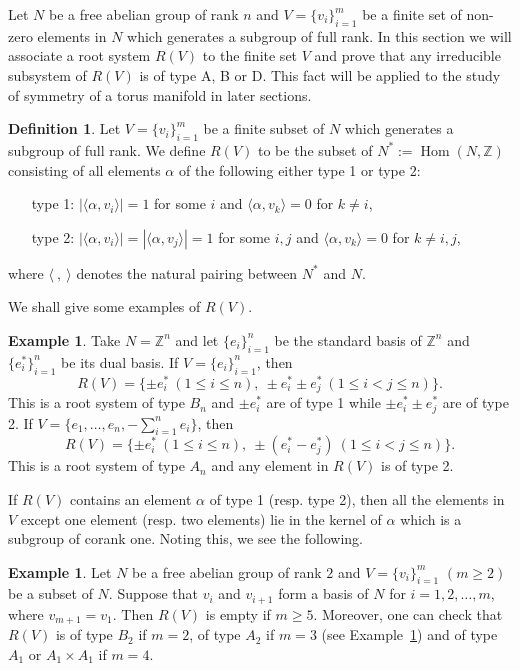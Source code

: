 \documentclass[12pt]{amsart}
\theoremstyle{plain} \numberwithin{equation}{section}
\theoremstyle{definition}
\newtheorem{defi}[theo]{Definition}
\newtheorem{exam}[theo]{Example}
\def\Z{\mathbb Z}
\def\MV{V}
\DeclareMathOperator{\Hom}{Hom}
\begin{document}
Let $N$ be a free abelian group of rank $n$ and $\MV=\{v_i\}_{i=1}^m$ be a finite set of non-zero elements in $N$ which generates a subgroup of full rank.  In this section we will associate a root system $R(\MV)$ to the finite set $\MV$ and prove that any irreducible subsystem of $R(\MV)$ is of type A, B or D.  
This fact will be applied to the study of symmetry of a torus manifold in later sections.  

\begin{defi} \label{defi:2-1}
Let $\MV=\{v_i\}_{i=1}^m$ be a finite subset of $N$ which generates a subgroup of full rank.  We define $R(\MV)$ to be the subset of $N^*:=\Hom(N,\Z)$ consisting of all elements $\alpha$ of the following either type 1 or type 2: 
\begin{enumerate}
\item[type 1:] $|\langle\alpha,v_i\rangle|=1$ for some $i$ and $\langle\alpha,v_k\rangle=0$ for $k\not=i$,  
\item[type 2:] $|\langle \alpha,v_i\rangle|=|\langle \alpha,v_j\rangle|=1$ for some $i,j$ and $\langle\alpha,v_k\rangle=0$ for $k\not=i,j$,
\end{enumerate}
where $\langle\ ,\ \rangle$ denotes the natural pairing between $N^*$ and $N$.  
\end{defi}

We shall give some examples of $R(\MV)$.  

\begin{exam} \label{exam:2-1}
Take $N=\Z^n$ and let $\{e_i\}_{i=1}^n$ be the standard basis of $\Z^n$ and $\{e_i^*\}_{i=1}^n$ be its dual basis. 
If $\MV=\{e_i\}_{i=1}^n$, then 
\[
R(\MV)=\{\pm e_i^*\ (1\le i\le n),\ \pm e_i^*\pm e_j^*\ (1\le i<j\le n) \}.
\]
This is a root system of type $B_n$ and $\pm e_i^*$ are of type 1 while $\pm e_i^*\pm e_j^*$ are of type 2.  
If $\MV=\{e_1,\dots,e_n, -\sum_{i=1}^ne_i\}$, then 
\[
R(\MV)=\{\pm e_i^*\ (1\le i\le n),\ \pm(e_i^*-e_j^*) \ (1\le i<j\le n)\}.
\]
This is a root system of type $A_n$ and any element in $R(\MV)$ is of type 2. 
\end{exam}


If $R(\MV)$ contains an element $\alpha$ of type 1 (resp. type 2), then all the elements in $\MV$ except one element (resp. two elements) lie in the kernel of $\alpha$ which is a subgroup of corank one.  Noting this, we see the following. 

\begin{exam} \label{exam:2-2}
Let $N$ be a free abelian group of rank $2$ and $\MV=\{v_i\}_{i=1}^m$ $(m\ge 2)$ be a subset of $N$.  Suppose that $v_i$ and $v_{i+1}$ form a basis of $N$ for $i=1,2,\dots,m$, where $v_{m+1}=v_1$.  Then $R(\MV)$ is empty if $m\ge 5$.  Moreover, one can check that $R(\MV)$ is of type $B_2$ if $m=2$, of type $A_2$ if $m=3$ (see Example~\ref{exam:2-1}) and of type $A_1$ or $A_1\times A_1$ if $m=4$.  
\end{exam}
\end{document}
